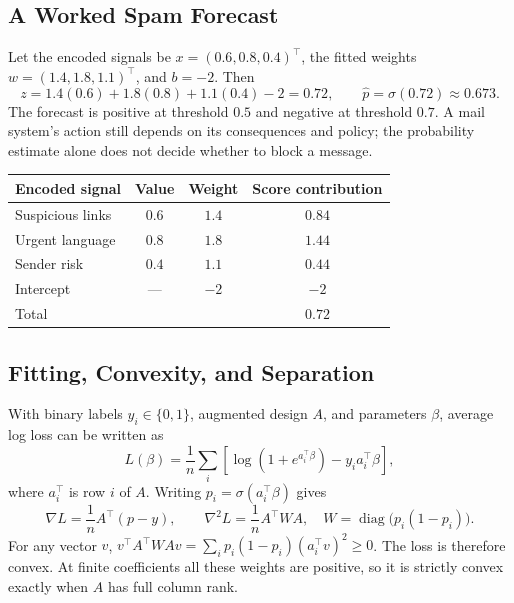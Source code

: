 \subsection{A Worked Spam Forecast}

Let the encoded signals be $x=(0.6,0.8,0.4)^\top$, the fitted weights $w=(1.4,1.8,1.1)^\top$, and $b=-2$. Then
\[
z=1.4(0.6)+1.8(0.8)+1.1(0.4)-2=0.72,
\qquad \hat p=\sigma(0.72)\approx0.673.
\]
The forecast is positive at threshold $0.5$ and negative at threshold $0.7$. A mail system's action still depends on its consequences and policy; the probability estimate alone does not decide whether to block a message.

\par\addvspace{\intextsep}\noindent\begin{minipage}{\linewidth}
\centering\small
\begin{tabular}{@{}L{3.1cm}ccc@{}}
\toprule
Encoded signal & Value & Weight & Score contribution \\
\midrule
Suspicious links & $0.6$ & $1.4$ & $0.84$ \\
Urgent language & $0.8$ & $1.8$ & $1.44$ \\
Sender risk & $0.4$ & $1.1$ & $0.44$ \\
Intercept & --- & $-2$ & $-2$ \\
\midrule
Total & & & $0.72$ \\
\bottomrule
\end{tabular}
\label{tab:logistic-decomposition}
\end{minipage}\par\addvspace{\intextsep}

\subsection{Fitting, Convexity, and Separation}

With binary labels $y_i\in\{0,1\}$, augmented design $A$, and parameters $\beta$, average log loss can be written as
\[
L(\beta)=\frac1n\sum_i\left[\log(1+e^{a_i^\top\beta})-y_i a_i^\top\beta\right],
\]
where $a_i^\top$ is row $i$ of $A$. Writing $p_i=\sigma(a_i^\top\beta)$ gives
\[
\nabla L=\frac1nA^\top(p-y),
\qquad
\nabla^2 L=\frac1nA^\top W A,
\quad W=\operatorname{diag}\bigl(p_i(1-p_i)\bigr).
\]
For any vector $v$, $v^\top A^\top WAv=\sum_i p_i(1-p_i)(a_i^\top v)^2\geq0$. The loss is therefore convex. At finite coefficients all these weights are positive, so it is strictly convex exactly when $A$ has full column rank.

